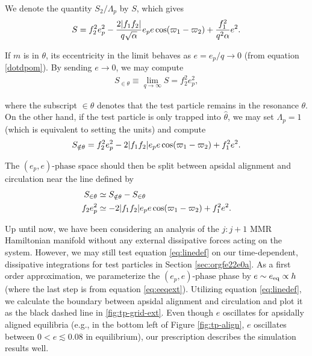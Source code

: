 \documentclass[usenatbib,twocolumn]{mnras}
\DeclarePairedDelimiter{\abs}{|}{|}
\begin{document}
We denote the quantity \(S_2/\Lambda_p\) by \(S\), which gives
\begin{align}
S =  f_2^2e_p^2 - \frac{2\abs{f_1f_2}}{q\sqrt{\alpha}}e_pe\cos(\varpi_1-\varpi_2)
+ \frac{f_1^2}{q^2\alpha}e^2.
\end{align}

\noindent
If \(m\) is in \(\theta\), its eccentricity
in the limit behaves as \(e=e_p/q\to0\) (from equation \eqref{dotdpom}).
By sending \(e\to0\), we may compute
\begin{align}
S_{\in\theta}  \equiv \lim_{q\to\infty} S = f_2^2e_p^2,
\end{align}

\noindent
where the subscript \(\in\theta\) denotes that the test particle remains
in the resonance \(\theta\).
On the other hand, if the test particle is only
trapped into \(\hat\theta\),
we may set \(\Lambda_p=1\) (which is equivalent to setting the units) and compute
\begin{align}
S_{\notin\theta} =  f_2^2e_p^2 - 2\abs{f_1f_2}e_pe\cos(\varpi_1-\varpi_2)
+ f_1^2e^2.
\end{align}

\noindent
The \((e_p,e)\text{-phase}\) space should then be split between apsidal alignment and circulation
near the line defined by
\begin{align}
S_{\in\theta} &\simeq S_{\notin\theta}-S_{\in\theta} \\
f_2e_p^2 &\simeq -2\abs{f_1f_2}e_pe\cos(\varpi_1-\varpi_2) + f_1^2e^2 \label{eq:linedef}.
\end{align}

Up until now, we have been considering an analysis of the \(j:j+1\) MMR
Hamiltonian manifold without any external dissipative forces acting on
the system. However, we may still test equation \eqref{eq:linedef} on
our time-dependent, dissipative integrations for test particles in
Section \ref{sec:orgfe22e0a}.  As a first order approximation, we
parameterize the \((e_p,e)\text{-phase}\) phase by \(e\sim e_{\rm eq}
\propto h\) (where the last step is from equation \eqref{eq:eeqext}).
Utilizing equation \eqref{eq:linedef}, we calculate the boundary between
apsidal alignment and circulation and plot it as the black dashed line
in \ref{fig:tp-grid-ext}.  Even though \(e\) oscillates for apsidally
aligned equilibria (e.g., in the bottom left of Figure
\ref{fig:tp-align}, \(e\) oscillates between \(0<e\lesssim 0.08\) in
equilibrium), our prescription describes the simulation results well.
\end{document}
